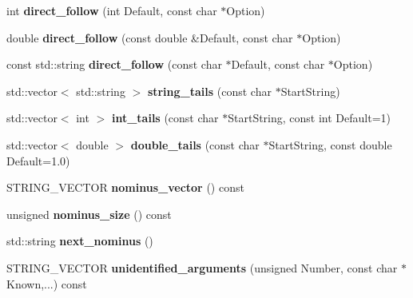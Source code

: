 \begin{DoxyCompactItemize}
\item 
\hypertarget{classGetPot_a2eec5ed54d86646402e5e16485601fea}{
int {\bfseries direct\_\-follow} (int Default, const char $\ast$Option)}
\label{classGetPot_a2eec5ed54d86646402e5e16485601fea}

\item 
\hypertarget{classGetPot_ad64bcf7d37c78bae36ad97aaac92a86b}{
double {\bfseries direct\_\-follow} (const double \&Default, const char $\ast$Option)}
\label{classGetPot_ad64bcf7d37c78bae36ad97aaac92a86b}

\item 
\hypertarget{classGetPot_aca40e39c14f630802931cac3c2aeb524}{
const std::string {\bfseries direct\_\-follow} (const char $\ast$Default, const char $\ast$Option)}
\label{classGetPot_aca40e39c14f630802931cac3c2aeb524}

\item 
\hypertarget{classGetPot_a2f79e3c21adc9568a507eb91ce15e4d0}{
std::vector$<$ std::string $>$ {\bfseries string\_\-tails} (const char $\ast$StartString)}
\label{classGetPot_a2f79e3c21adc9568a507eb91ce15e4d0}

\item 
\hypertarget{classGetPot_a269879b326c9388c7145bad57ca5fcb1}{
std::vector$<$ int $>$ {\bfseries int\_\-tails} (const char $\ast$StartString, const int Default=1)}
\label{classGetPot_a269879b326c9388c7145bad57ca5fcb1}

\item 
\hypertarget{classGetPot_aa50b6e2ea274355c930a608079a88a1f}{
std::vector$<$ double $>$ {\bfseries double\_\-tails} (const char $\ast$StartString, const double Default=1.0)}
\label{classGetPot_aa50b6e2ea274355c930a608079a88a1f}

\item 
\hypertarget{classGetPot_a2bb3ce06e8d8d1875722480254e8fc56}{
STRING\_\-VECTOR {\bfseries nominus\_\-vector} () const }
\label{classGetPot_a2bb3ce06e8d8d1875722480254e8fc56}

\item 
\hypertarget{classGetPot_ab696e5463b8a7e1e5cbab563e406db60}{
unsigned {\bfseries nominus\_\-size} () const }
\label{classGetPot_ab696e5463b8a7e1e5cbab563e406db60}

\item 
\hypertarget{classGetPot_a99f571a68efe22003f5162e739c7b801}{
std::string {\bfseries next\_\-nominus} ()}
\label{classGetPot_a99f571a68efe22003f5162e739c7b801}

\item 
\hypertarget{classGetPot_aa5c283ed5ae3f40341df871c5cdf6588}{
STRING\_\-VECTOR {\bfseries unidentified\_\-arguments} (unsigned Number, const char $\ast$Known,...) const }
\label{classGetPot_aa5c283ed5ae3f40341df871c5cdf6588}


\end{DoxyCompactItemize}
